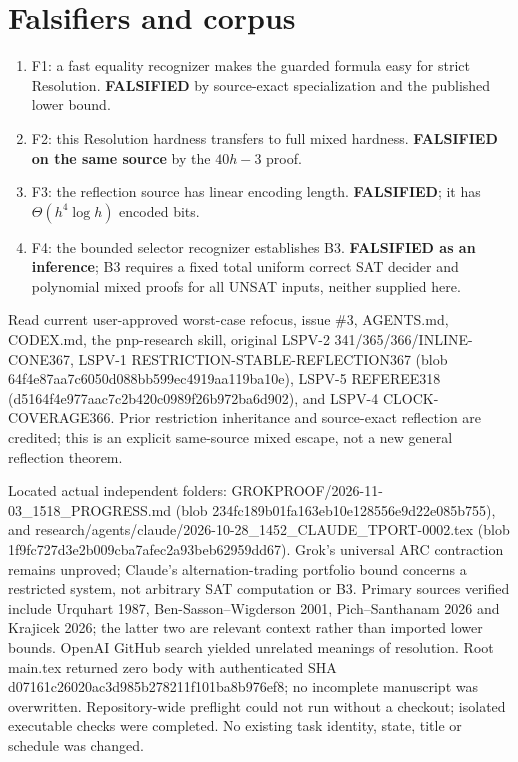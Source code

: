 \documentclass{article}
\begin{document}
\section*{Falsifiers and corpus}
\begin{enumerate}
\item[] F1: a fast equality recognizer makes the guarded formula easy for strict Resolution. \textbf{FALSIFIED} by source-exact specialization and the published lower bound.
\item[] F2: this Resolution hardness transfers to full mixed hardness. \textbf{FALSIFIED on the same source} by the $40h-3$ proof.
\item[] F3: the reflection source has linear encoding length. \textbf{FALSIFIED}; it has $\Theta(h^4\log h)$ encoded bits.
\item[] F4: the bounded selector recognizer establishes B3. \textbf{FALSIFIED as an inference}; B3 requires a fixed total uniform correct SAT decider and polynomial mixed proofs for all UNSAT inputs, neither supplied here.
\end{enumerate}
Read current user-approved worst-case refocus, issue \#3, AGENTS.md, CODEX.md, the pnp-research skill, original LSPV-2 341/365/366/INLINE-CONE367, LSPV-1 RESTRICTION-STABLE-REFLECTION367 (blob 64f4e87aa7c6050d088bb599ec4919aa119ba10e), LSPV-5 REFEREE318 (d5164f4e977aac7c2b420c0989f26b972ba6d902), and LSPV-4 CLOCK-COVERAGE366. Prior restriction inheritance and source-exact reflection are credited; this is an explicit same-source mixed escape, not a new general reflection theorem.

Located actual independent folders: GROKPROOF/2026-11-03\_1518\_PROGRESS.md (blob 234fc189b01fa163eb10e128556e9d22e085b755), and research/agents/claude/2026-10-28\_1452\_CLAUDE\_TPORT-0002.tex (blob 1f9fc727d3e2b009cba7afec2a93beb62959dd67). Grok's universal ARC contraction remains unproved; Claude's alternation-trading portfolio bound concerns a restricted system, not arbitrary SAT computation or B3. Primary sources verified include Urquhart 1987, Ben-Sasson--Wigderson 2001, Pich--Santhanam 2026 and Krajicek 2026; the latter two are relevant context rather than imported lower bounds. OpenAI GitHub search yielded unrelated meanings of resolution. Root main.tex returned zero body with authenticated SHA d07161c26020ac3d985b278211f101ba8b976ef8; no incomplete manuscript was overwritten. Repository-wide preflight could not run without a checkout; isolated executable checks were completed. No existing task identity, state, title or schedule was changed.
\end{document}
